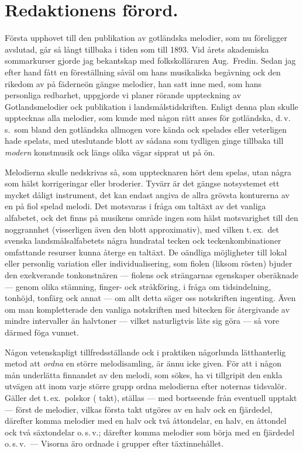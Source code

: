 \documentclass[a4paper,english]{article}
\begin{document}
\section*{Redaktionens förord.}
Första upphovet till den publikation av gotländska melodier,
som nu föreligger avslutad, går så långt tillbaka i tiden som till
1893. Vid årets akademiska sommarkurser gjorde jag bekantskap
med folkskolläraren Aug.\ Fredin. Sedan jag efter hand fått en
föreställning såväl om hans musikaliska begåvning ock den rikedom
av på fäderneön gängse melodier, han satt inne med, som hans
personliga redbarhet, uppgjorde vi planer rörande uppteckning av
Gotlandsmelodier ock publikation i landsmålstidskriften. Enligt denna
plan skulle upptecknas alla melodier, som kunde med någon rätt
anses för gotländska, d.\,v.\,s.\ som bland den gotländska allmogen vore
kända ock spelades eller veterligen hade spelats, med uteslutande
blott av sådana som tydligen ginge tillbaka till \textit{modern} konstmusik
ock längs olika vägar sipprat ut på ön.

Melodierna skulle nedskrivas så, som upptecknaren hört dem
spelas, utan några som hälst korrigeringar eller broderier. Tyvärr
är det gängse notsystemet ett mycket dåligt instrument, det kan
endast angiva de allra grövsta konturerna av en på fiol spelad
melodi. Det motsvaras i fråga om taltäxt av det vanliga alfabetet,
ock det finns på musikens område ingen som hälst motsvarighet till
den noggrannhet (visserligen även den blott approximativ), med vilken
t.\,ex.\ det svenska landsmålsalfabetets några hundratal tecken ock
teckenkombinationer omfattande resurser kunna återge en taltäxt.
De oändliga möjligheter till lokal eller personlig variation eller
individualisering, som fiolen (liksom rösten) bjuder den exekverande
tonkonstnären --- fiolens ock strängarnas egenskaper oberäknade ---
genom olika stämning, finger- ock stråkföring, i fråga om tidsindelning,
tonhöjd, tonfärg ock annat --- om allt detta säger oss notskriften
ingenting. Även om man kompletterade den vanliga notskriften
med bitecken för återgivande av mindre intervaller än halvtoner ---
vilket naturligtvis läte sig göra --- så vore därmed föga vunnet.

\sloppy
Någon vetenskapligt tillfredsställande ock i praktiken någorlunda  %
lätthanterlig metod att \textit{ordna} en större melodisamling, är
ännu icke given. För att i någon mån underlätta finnandet av den melodi,
som sökes, ha vi tillgripit den enkla utvägen att inom varje större
grupp ordna melodierna efter noternas tidsvalör. Gäller det t.\,ex.\ 
polskor ( takt), ställas --- med bortseende från eventuell upptakt
--- först de melodier, vilkas första takt utgöres av en halv ock en
fjärdedel, därefter komma melodier med en halv ock två åttondelar,
en halv, en åttondel ock två säxtondelar o.\,s.\,v.; därefter komma
melodier som börja med en fjärdedel o.\,s.\,v.\ --- Visorna äro
ordnade i grupper efter täxtinnehållet.
\end{document}
